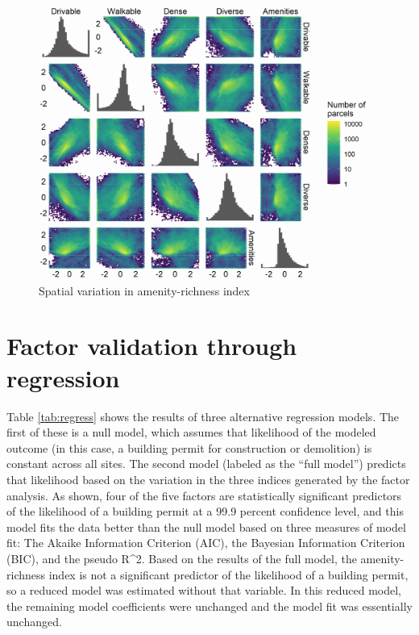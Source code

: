 \documentclass[
]{book}
\begin{document}
\begin{figure}
\includegraphics[width=1\linewidth]{04_figures/factor-cor} \caption{Spatial variation in amenity-richness index}\label{fig:factor-cor}
\end{figure}

\hypertarget{factor-validation-through-regression}{%
\section{Factor validation through regression}\label{factor-validation-through-regression}}

Table \ref{tab:regress} shows the results of three alternative regression models. The first of these is a
null model, which assumes that likelihood of the modeled outcome (in this case, a building permit for construction
or demolition) is constant across all sites. The second model
(labeled as the ``full model'') predicts that likelihood based
on the variation in the three indices generated by the
factor analysis. As shown, four of the five factors are
statistically significant predictors of the likelihood of
a building permit at a 99.9 percent confidence level, and this model fits the data better than the null model
based on three measures of model fit: The Akaike Information
Criterion (AIC), the Bayesian Information Criterion (BIC), and the pseudo R\^{}2. Based on the results of the full model, the amenity-richness index is not a significant predictor
of the likelihood of a building permit, so a reduced model
was estimated without that variable. In this reduced model,
the remaining model coefficients were unchanged and the
model fit was essentially unchanged.
\end{document}

